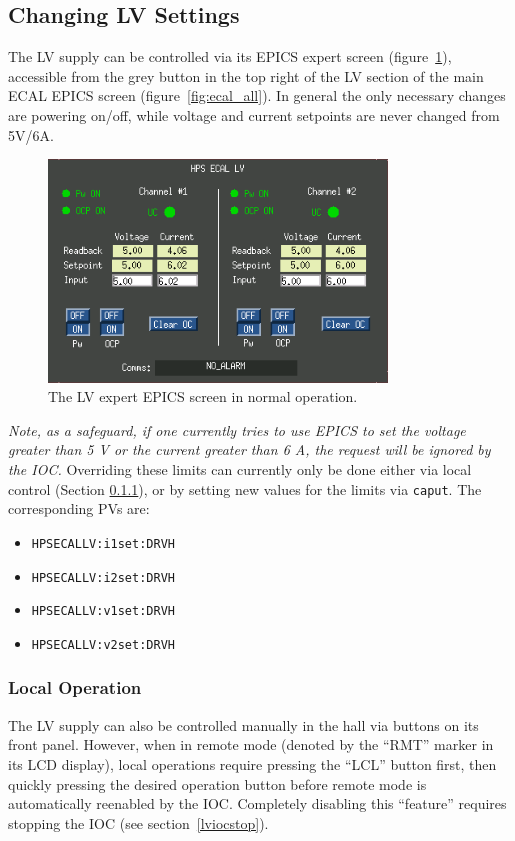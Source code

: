 \documentclass[12pt]{article}
\begin{document}
\subsection{Changing LV Settings}
The LV supply can be controlled via its EPICS expert screen (figure~\ref{lvexpert}), accessible from the grey button in the top right of the LV section of the main ECAL EPICS screen (figure~\ref{fig:ecal_all}). In general the only necessary changes are powering on/off, while voltage and current setpoints are never changed from 5V/6A.
\begin{figure}[htbp]\centering
    \includegraphics[width=9cm]{pics/lvexpert}
    \caption{The LV expert EPICS screen in normal operation.\label{lvexpert}}
\end{figure}

{\em Note, as a safeguard, if one currently tries to use EPICS to set the voltage greater than 5 V or the current greater than 6 A, the request will be ignored by the IOC.}  Overriding these limits can currently only be done either via local control (Section \ref{sec:lvlocalops}), or by setting new values for the limits via \texttt{caput}.  The corresponding PVs are:
{\footnotesize
\begin{itemize}
    \item\texttt{HPSECALLV:i1set:DRVH}
    \item\texttt{HPSECALLV:i2set:DRVH}
    \item\texttt{HPSECALLV:v1set:DRVH}
    \item\texttt{HPSECALLV:v2set:DRVH}
\end{itemize}
}
\subsubsection{Local Operation}\label{sec:lvlocalops}
The LV supply can also be controlled manually in the hall via buttons on its front panel.  However, when in remote mode (denoted by the ``RMT'' marker in its LCD display), local operations require pressing the ``LCL'' button first, then quickly pressing the desired operation button before remote mode is automatically reenabled by the IOC.  Completely disabling this ``feature'' requires stopping the IOC (see section~\ref{lviocstop}).
\end{document}
